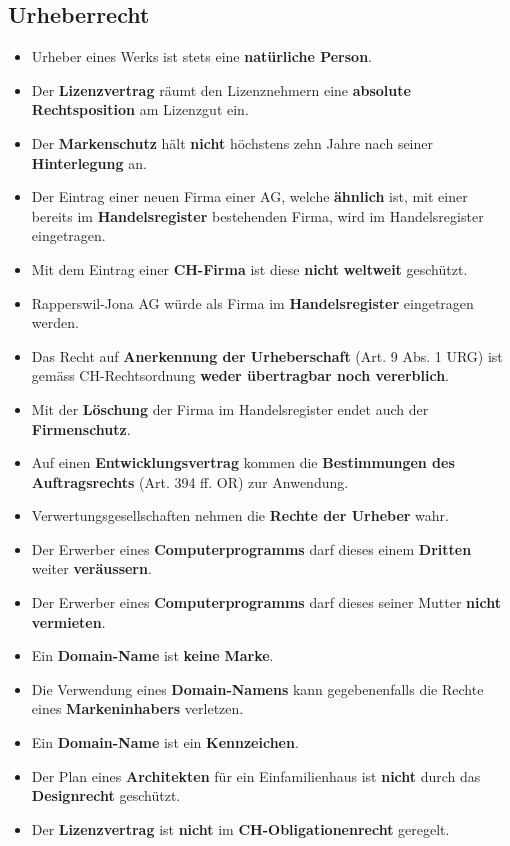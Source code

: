 \subsection{Urheberrecht}
\begin{itemize}
	\item Urheber eines Werks ist stets eine \textbf{natürliche Person}.
	\item Der \textbf{Lizenzvertrag} räumt den Lizenznehmern eine \textbf{absolute Rechtsposition} am Lizenzgut ein.
	\item Der \textbf{Markenschutz} hält \textbf{nicht} höchstens zehn Jahre nach seiner \textbf{Hinterlegung} an.
	\item Der Eintrag einer neuen Firma einer AG, welche \textbf{ähnlich} ist, mit einer bereits im \textbf{Handelsregister} bestehenden Firma, wird im Handelsregister eingetragen.
	\item Mit dem Eintrag einer \textbf{CH-Firma} ist diese \textbf{nicht} \textbf{weltweit} geschützt.
	\item Rapperswil-Jona AG würde als Firma im \textbf{Handelsregister} eingetragen werden.
	\item Das Recht auf \textbf{Anerkennung der Urheberschaft} (Art. 9 Abs. 1 URG) ist gemäss CH-Rechtsordnung \textbf{weder übertragbar noch vererblich}.
	\item Mit der \textbf{Löschung} der Firma im Handelsregister endet auch der \textbf{Firmenschutz}.
	\item Auf einen \textbf{Entwicklungsvertrag} kommen die \textbf{Bestimmungen des Auftragsrechts} (Art. 394 ff. OR) zur Anwendung.
	\item{Verwertungsgesellschaften} nehmen die \textbf{Rechte der Urheber} wahr.
	\item Der Erwerber eines \textbf{Computerprogramms} darf dieses einem \textbf{Dritten} weiter \textbf{veräussern}.
	\item Der Erwerber eines \textbf{Computerprogramms} darf dieses seiner Mutter \textbf{nicht} \textbf{vermieten}.
	\item Ein \textbf{Domain-Name} ist \textbf{keine} \textbf{Marke}.
	\item Die Verwendung eines \textbf{Domain-Namens} kann gegebenenfalls die Rechte eines \textbf{Markeninhabers} verletzen.
	\item Ein \textbf{Domain-Name} ist ein \textbf{Kennzeichen}.
	\item Der Plan eines \textbf{Architekten} für ein Einfamilienhaus ist \textbf{nicht} durch das \textbf{Designrecht} geschützt.
	\item Der \textbf{Lizenzvertrag} ist \textbf{nicht} im \textbf{CH-Obligationenrecht} geregelt.
\end{itemize} 

